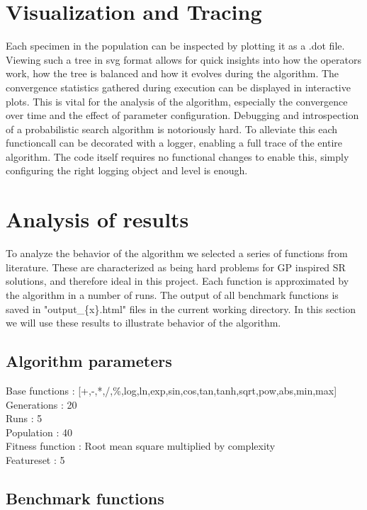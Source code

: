 \documentclass[10pt]{extarticle}
\begin{document}
\section{Visualization and Tracing}
Each specimen in the population can be inspected by plotting it as a .dot file. Viewing such a tree in svg format allows for quick insights into how the operators work, how the tree is balanced and how it evolves during the algorithm.
The convergence statistics gathered during execution can be displayed in interactive plots. This is vital for the analysis of the algorithm, especially the convergence over time and the effect of parameter configuration.
Debugging and introspection of a probabilistic search algorithm is notoriously hard. To alleviate this each functioncall can be decorated with a logger, enabling a full trace of the entire algorithm. The code itself requires no functional changes to enable this, simply configuring the right logging object and level is enough.
\section{Analysis of results}
To analyze the behavior of the algorithm we selected a series of functions from literature. These are characterized as being hard problems for GP inspired SR solutions, and therefore ideal in this project. 
Each function is approximated by the algorithm in a number of runs. 
The output of all benchmark functions is saved in "output\_\{x\}.html" files in the current working directory.
In this section we will use these results to illustrate behavior of the algorithm.
\subsection{Algorithm parameters}
Base functions : [+,-,*,/,\%,log,ln,exp,sin,cos,tan,tanh,sqrt,pow,abs,min,max]\\
Generations : 20\\
Runs : 5\\
Population : 40\\
Fitness function : Root mean square multiplied by complexity\\
Featureset : 5\\
\subsection{Benchmark functions}
\end{document}
